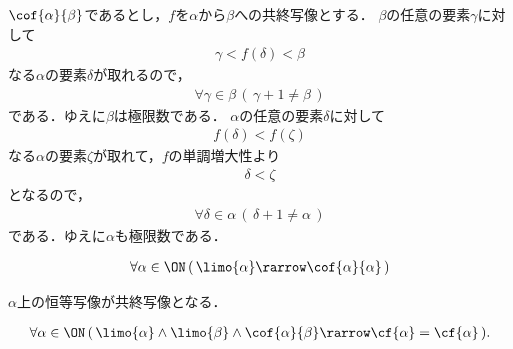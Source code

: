 	\begin{sketch}
		$\cof{\alpha}{\beta}$であるとし，$f$を$\alpha$から$\beta$への共終写像とする．
		$\beta$の任意の要素$\gamma$に対して
		\begin{align}
			\gamma < f(\delta) < \beta
		\end{align}
		なる$\alpha$の要素$\delta$が取れるので，
		\begin{align}
			\forall \gamma \in \beta\, (\, \gamma + 1 \neq \beta\, )
		\end{align}
		である．ゆえに$\beta$は極限数である．
		$\alpha$の任意の要素$\delta$に対して
		\begin{align}
			f(\delta) < f(\zeta)
		\end{align}
		なる$\alpha$の要素$\zeta$が取れて，$f$の単調増大性より
		\begin{align}
			\delta < \zeta
		\end{align}
		となるので，
		\begin{align}
			\forall \delta \in \alpha\, (\, \delta+ 1 \neq \alpha\, )
		\end{align}
		である．ゆえに$\alpha$も極限数である．
		\QED
	\end{sketch}
	
	\begin{screen}
		\begin{thm}[極限数は自分自身と共終]
			\begin{align}
				\forall \alpha \in \ON\, 
				(\, \limo{\alpha} \rarrow \cof{\alpha}{\alpha}\, )
			\end{align}
		\end{thm}
	\end{screen}
	
	\begin{sketch}
		$\alpha$上の恒等写像が共終写像となる．
	\end{sketch}
	
	\begin{screen}
		\begin{thm}[共終なら共終数は同じ]
			\begin{align}
				\forall \alpha \in \ON\, 
				(\, \limo{\alpha} \wedge \limo{\beta} \wedge \cof{\alpha}{\beta}
				 \rarrow \cf{\alpha} = \cf{\alpha}\, ).
			\end{align}
		\end{thm}
	\end{screen}
	
